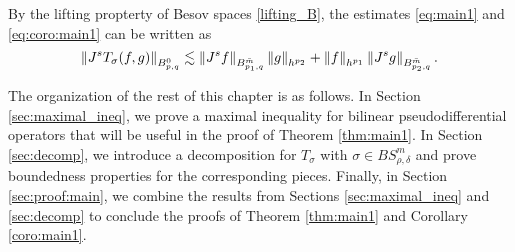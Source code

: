 \begin{remark}\label{remark_3}
By the lifting propterty of Besov spaces \eqref{lifting_B}, the estimates \eqref{eq:main1} and \eqref{eq:coro:main1} can be written as 
$$ \norm{J^s T_\sigma(f,g)}{\ibes{p}{0}{q}}\lesssim \norm{J^s f}{\ibes{p_1}{\bar{m}}{q}}\norm{g}{h^{p_2}} +\norm{f}{h^{p_1}}\norm{J^s g}{\ibes{p_2}{\bar{m}}{q}}.  $$
\end{remark}

The organization of the rest of this chapter is as follows. In Section \ref{sec:maximal_ineq}, we prove a maximal inequality for bilinear pseudodifferential operators that will be useful in the proof of Theorem \ref{thm:main1}. In Section \ref{sec:decomp}, we introduce a decomposition for $T_\sigma$ with $\sigma \in BS^m_{\rho,\delta}$ and prove boundedness properties for the corresponding pieces. Finally, in Section \ref{sec:proof:main}, we combine the results from Sections \ref{sec:maximal_ineq} and \ref{sec:decomp} to conclude the proofs of Theorem \ref{thm:main1} and Corollary \ref{coro:main1}.




